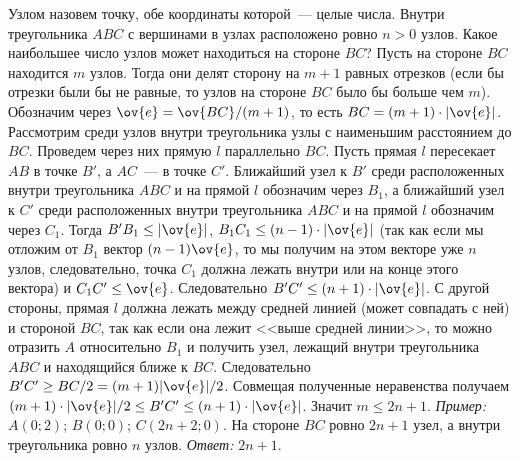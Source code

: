 \problem{}
Узлом назовем точку, обе координаты которой~--- целые числа.
Внутри треугольника $ABC$ с вершинами в узлах расположено ровно $n > 0$ узлов.
Какое наибольшее число узлов может находиться на стороне $BC$?
\solution
Пусть на стороне $BC$ находится $m$ узлов.
Тогда они делят сторону на $m + 1$ равных отрезков
(если бы отрезки были бы не равные, то узлов на стороне $BC$ было бы больше чем
$m$).
Обозначим через $\ov{e} = \ov{BC} / (m + 1)$, то есть
$BC = (m + 1) \cdot |\ov{e}|$.
Рассмотрим среди узлов внутри треугольника узлы с наименьшим расстоянием до
$BC$.
Проведем через них прямую $l$ параллельно $BC$.
Пусть прямая $l$ пересекает $AB$ в точке $B'$, а $AC$~--- в точке $C'$.
Ближайший узел к $B'$ среди расположенных внутри треугольника $ABC$ и на прямой
$l$ обозначим через $B_1$, а ближайший узел к $C'$ среди расположенных внутри
треугольника $ABC$ и на прямой $l$ обозначим через $C_1$.
Тогда $B'B_1 \leq |\ov{e}|$, $B_1C_1 \leq (n - 1) \cdot |\ov{e}|$
(так как если мы отложим от $B_1$ вектор $(n - 1) \ov{e}$, то мы получим на
этом векторе уже $n$ узлов, следовательно, точка $C_1$ должна лежать внутри или
на конце этого вектора)
и $C_1C' \leq \ov{e}$.
Следовательно $B'C' \leq (n + 1) \cdot |\ov{e}|$.
С другой стороны, прямая $l$ должна лежать между средней линией
(может совпадать с ней) и стороной $BC$, так как если она лежит
<<выше средней линии>>, то можно отразить $A$ относительно $B_1$ и получить
узел, лежащий внутри треугольника $ABC$ и находящийся ближе к $BC$.
Следовательно $B'C' \geq BC / 2 = (m + 1) |\ov{e}| / 2$.
Совмещая полученные неравенства получаем
$(m + 1) \cdot |\ov{e}| / 2 \leq B'C' \leq (n + 1) \cdot |\ov{e}|$.
Значит $m \leq 2 n + 1$.
\emph{Пример:} $A(0; 2)$; $B(0; 0)$; $C(2 n + 2; 0)$.
На стороне $BC$ ровно $2 n + 1$ узел, а внутри треугольника ровно $n$ узлов.
\emph{Ответ:} $2 n + 1$.
\endproblem
